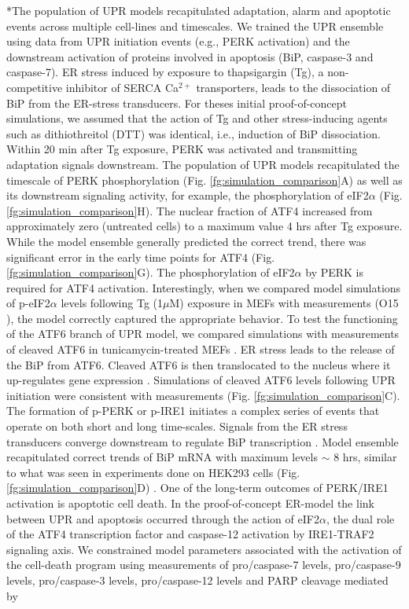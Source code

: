 \documentclass[12pt]{article}
\makeatletter
\renewcommand\subsection{\@startsection
	{subsection}{2}{0mm}
	{-0.05in}
	{-0.5\baselineskip}
	{\normalfont\normalsize\bfseries}}
\makeatother
\begin{document}
\subsection*{The population of UPR models recapitulated adaptation, alarm and apoptotic events across multiple cell-lines and timescales.} 
We trained the UPR ensemble using data from UPR initiation events (e.g., PERK activation) and the downstream activation of proteins involved in apoptosis (BiP, caspase-3 and caspase-7). ER stress induced by exposure to thapsigargin (Tg), a non-competitive inhibitor of SERCA Ca$^{2+}$ transporters, leads to the dissociation of BiP from the ER-stress transducers. For theses initial proof-of-concept simulations, we assumed that the action of Tg and other stress-inducing agents such as dithiothreitol (DTT) was identical, i.e., induction of BiP dissociation. Within 20 min after Tg exposure, PERK was activated and transmitting adaptation signals downstream. The population of UPR models recapitulated the timescale of PERK phosphorylation (Fig. \ref{fg:simulation_comparison}A) as well as its downstream signaling activity, for example, the phosphorylation of eIF2$\alpha$ (Fig. \ref{fg:simulation_comparison}H). The nuclear fraction of ATF4 increased from approximately zero (untreated cells) to a maximum value 4 hrs after Tg exposure. While the model ensemble generally predicted the correct trend, there was significant error in the early time points for ATF4 (Fig. \ref{fg:simulation_comparison}G). The phosphorylation of eIF2$\alpha$ by PERK is required for ATF4 activation. Interestingly, when we compared model simulations of p-eIF2$\alpha$ levels following Tg (1$\mu$M) exposure in MEFs with measurements (O15 \cite{yamamoto2007tim}), the model correctly captured the appropriate behavior. To test the functioning of the ATF6 branch of UPR model, we compared simulations with measurements of cleaved ATF6 in tunicamycin-treated MEFs \cite{lee2002imu}. ER stress leads to the release of the BiP from ATF6. Cleaved ATF6 is then translocated to the nucleus where it up-regulates gene expression \cite{silver1999mtf,hai1989tfa}. Simulations of cleaved ATF6 levels following UPR initiation were consistent with measurements (Fig. \ref{fg:simulation_comparison}C). The formation of p-PERK or p-IRE1 initiates a complex series of events that operate on both short and long time-scales. Signals from the ER stress transducers converge downstream to regulate BiP transcription \cite{malhotra2007era, rao2004mpe,kokame2001iei, yoshida2000aap}. Model ensemble recapitulated correct trends of BiP mRNA with maximum levels $\sim$ 8 hrs, similar to what was seen in experiments done on HEK293 cells (Fig. \ref{fg:simulation_comparison}D) \cite{lin2007ire1}. One of the long-term outcomes of PERK/IRE1 activation is apoptotic cell death. In the proof-of-concept ER-model the link between UPR and apoptosis occurred through the action of eIF2$\alpha$, the dual role of the ATF4 transcription factor and caspase-12 activation by IRE1-TRAF2 signaling axis. We constrained model parameters associated with the activation of the cell-death program using measurements of pro/caspase-7 levels, pro/caspase-9 levels, pro/caspase-3 levels, pro/caspase-12 levels and PARP cleavage mediated by 
\end{document}

